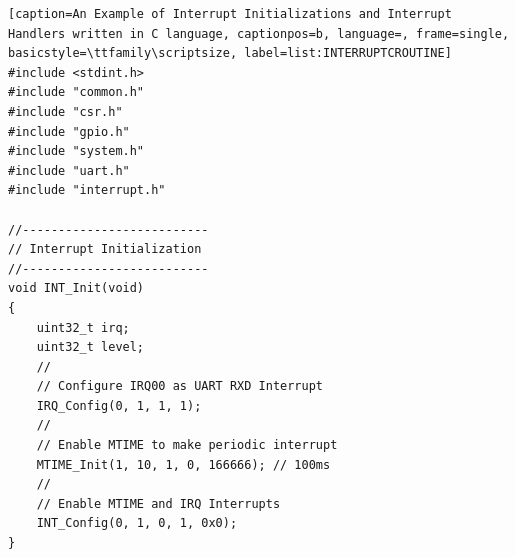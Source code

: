 \begin{lstlisting}[caption=An Example of Interrupt Initializations and Interrupt Handlers written in C language, captionpos=b, language=, frame=single, basicstyle=\ttfamily\scriptsize, label=list:INTERRUPTCROUTINE]
#include <stdint.h>
#include "common.h"
#include "csr.h"
#include "gpio.h"
#include "system.h"
#include "uart.h"
#include "interrupt.h"

//--------------------------
// Interrupt Initialization
//--------------------------
void INT_Init(void)
{
    uint32_t irq;
    uint32_t level;
    //
    // Configure IRQ00 as UART RXD Interrupt
    IRQ_Config(0, 1, 1, 1);
    //
    // Enable MTIME to make periodic interrupt
    MTIME_Init(1, 10, 1, 0, 166666); // 100ms
    //
    // Enable MTIME and IRQ Interrupts
    INT_Config(0, 1, 0, 1, 0x0);
}


\end{lstlisting}
